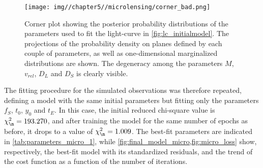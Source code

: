 \begin{figure}
    \centering
    \texttt{[image: img//chapter5//microlensing/corner\_bad.png]}
    \caption[Microlensing corner plot showing degeneracy]{Corner plot showing the posterior probability distributions of the parameters used to fit the light-curve in \cref{fig:lc_initialmodel}. The projections of the probability density on planes defined by each couple of parameters, as well as one-dimensional marginalized distributions are shown. The degeneracy among the parameters $M$, $v_{rel}$, $D_L$ and $D_S$ is clearly visible.}
    \label{fig:corner_micro_bad}
\end{figure}

The fitting procedure for the simulated observations was therefore repeated, defining a model with the same initial parameters but fitting only the parameters $f_S$, $t_0$, $y_0$ and $t_E$. In this case, the initial reduced chi-square value is $\chi_\n^2 = 193.270$, and after training the model for the same number of epochs as before, it drops to a value of $\chi_\n^2 = 1.009$. The best-fit parameters are indicated in \cref{tab:parameters_micro_1}, while \cref{fig:final_model_micro,fig:micro_loss} show, respectively, the best-fit model with its standardized residuals, and the trend of the cost function as a function of the number of iterations.

